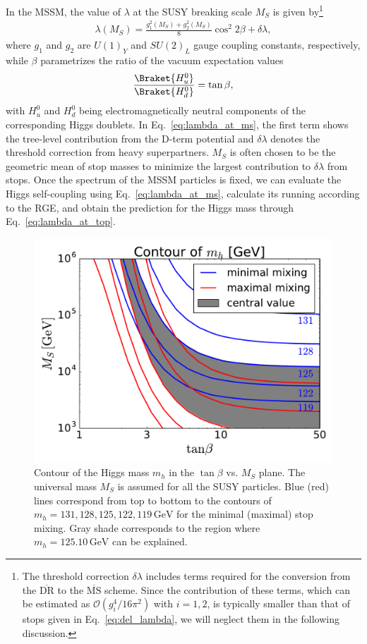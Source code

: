 \documentclass[12pt,twoside,book]{article}
\begin{document}
In the MSSM, the value of $\lambda$ at the SUSY breaking scale $M_S$ is given by\footnote{
  The threshold correction $\delta \lambda$ includes terms required for the conversion from the $\overline{\text{DR}}$ to the $\overline{\text{MS}}$ scheme.
  Since the contribution of these terms, which can be estimated as $\mathcal{O} (g_i^4 / 16\pi^2)$ with $i=1,2$, is typically smaller than that of stops given in Eq.~\eqref{eq:del_lambda}, we will neglect them in the following discussion.
}
\begin{align}
  \lambda (M_S) = \frac{g_1^2 (M_S) + g_2^2 (M_S)}{8} \cos^2 2\beta + \delta \lambda,
  \label{eq:lambda_at_ms}
\end{align}
where $g_1$ and $g_2$ are $U(1)_Y$ and $SU(2)_L$ gauge coupling constants, respectively, while $\beta$ parametrizes the ratio of the vacuum expectation values
\begin{align}
  \frac{\Braket{H_u^0}}{\Braket{H_d^0}} = \tan \beta,
\end{align}
with $H_u^0$ and $H_d^0$ being electromagnetically neutral components of the corresponding Higgs doublets.
In Eq.~\eqref{eq:lambda_at_ms}, the first term shows the tree-level contribution from the D-term potential and $\delta \lambda$ denotes the threshold correction from heavy superpartners.
$M_S$ is often chosen to be the geometric mean of stop masses to minimize the largest contribution to $\delta \lambda$ from stops.
Once the spectrum of the MSSM particles is fixed, we can evaluate the Higgs self-coupling using Eq.~\eqref{eq:lambda_at_ms}, calculate its running according to the RGE, and obtain the prediction for the Higgs mass through Eq.~\eqref{eq:lambda_at_top}.

\begin{figure}[t]
  \centering
  \includegraphics[width=0.6\hsize]{higgs_mass.pdf}
  \caption{
    Contour of the Higgs mass $m_h$ in the $\tan\beta$ vs. $M_S$ plane.
    The universal mass $M_S$ is assumed for all the SUSY particles.
    Blue (red) lines correspond from top to bottom to the contours of $m_h = 131, 128, 125, 122, 119\, \mathrm{GeV}$ for the minimal (maximal) stop mixing.
    Gray shade corresponds to the region where $m_h = 125.10\,\mathrm{GeV}$ can be explained.
  }
  \label{fig:higgs_mass}
\end{figure}
\end{document}
